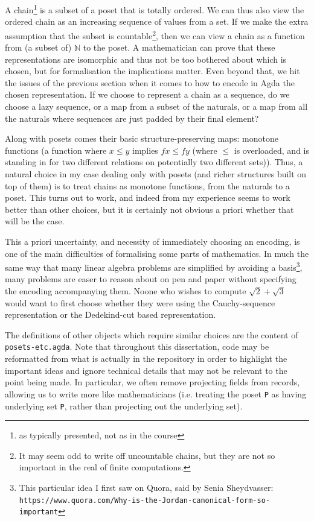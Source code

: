 \documentclass[12pt,a4paper,twoside,openright]{report}
\begin{document}
A chain\footnote{as typically presented, not as in the course} is a subset of a poset that is totally ordered. We can thus also view the ordered chain as an increasing sequence of values from a set. If we make the extra assumption that the subset is countable\footnote{It may seem odd to write off uncountable chains, but they are not so important in the real of finite computations.}, then we can view a chain as a function from (a subset of) $\mathbb{N}$ to the poset. A mathematician can prove that these representations are isomorphic and thus not be too bothered about which is chosen, but for formalisation the implications matter. Even beyond that, we hit the issues of the previous section when it comes to how to encode in Agda the chosen representation. If we choose to represent a chain as a sequence, do we choose a lazy sequence, or a map from a subset of the naturals, or a map from all the naturals where sequences are just padded by their final element? 

Along with posets comes their basic structure-preserving maps: monotone functions (a function where $x \leq y$ implies $f x \leq f y$ (where $\leq$ is overloaded, and is standing in for two different relations on potentially two different sets)). Thus, a natural choice in my case dealing only with posets (and richer structures built on top of them) is to treat chains as monotone functions, from the naturals to a poset. This turns out to work, and indeed from my experience seems to work better than other choices, but it is certainly not obvious a priori whether that will be the case.

This a priori uncertainty, and necessity of immediately choosing an encoding, is one of the main difficulties of formalising some parts of mathematics. In much the same way that many linear algebra problems are simplified by avoiding a basis\footnote{This particular idea I first saw on Quora, said by Senia Sheydvasser: \texttt{https://www.quora.com/Why-is-the-Jordan-canonical-form-so-important}}, many problems are easer to reason about on pen and paper without specifying the encoding accompanying them. Noone who wishes to compute $\sqrt{2} + \sqrt{3}$ would want to first choose whether they were using the Cauchy-sequence representation or the Dedekind-cut based representation. 

The definitions of other objects which require similar choices are the content of \texttt{posets-etc.agda}. Note that throughout this dissertation, code may be reformatted from what is actually in the repository in order to highlight the important ideas and ignore technical details that may not be relevant to the point being made. In particular, we often remove projecting fields from records, allowing us to write more like mathematicians (i.e. treating the poset \texttt{P} as having underlying set \texttt{P}, rather than projecting out the underlying set). 
\end{document}
